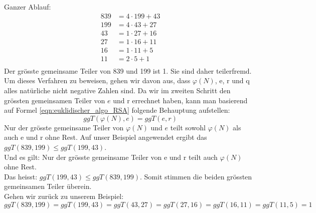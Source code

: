 %
Ganzer Ablauf:
\begin{equation*}
  \begin{split}
    839 &= 4 \cdot 199 + 43\\
    199 &= 4 \cdot 43 + 27\\
    43 &= 1 \cdot 27 + 16\\
    27 &= 1 \cdot 16 + 11\\
    16 &= 1 \cdot 11 + 5\\
    11 &= 2 \cdot 5 + 1\\
    \label{eqn:euqulid_beweis}
  \end{split}
\end{equation*}
%
Der grösste gemeinsame Teiler von 839 und 199 ist 1. Sie sind daher teilerfremd. \\[2ex]
Um dieses Verfahren zu beweisen, gehen wir davon aus, dass $\varphi(N)$, e, r und q alles natürliche nicht negative Zahlen sind. Da wir im zweiten Schritt den grössten gemeinsamen Teiler von $e$ und r errechnet haben, kann man basierend auf Formel \ref{eqn:euklidischer_algo_RSA} folgende Behauptung aufstellen:
%
\begin{equation}
  ggT(\varphi(N),e) = ggT(e,r)
  \label{eqn:ggT}
\end{equation}
%
Nur der grösste gemeinsame Teiler von $\varphi(N)$ und $e$ teilt sowohl $\varphi(N)$ als auch e und r ohne Rest. Auf unser Beispiel angewendet ergibt das $ggT(839,199) \leq ggT(199,43)$.\\
Und es gilt: Nur der grösste gemeinsame Teiler von e und r teilt auch $\varphi(N)$ ohne Rest.\\
Das heisst: $ggT(199,43) \leq ggT(839,199)$.
Somit stimmen die beiden grössten gemeinsamen Teiler überein\cite{zahlentheorie_fuer_einsteiger}.\\[2ex]
Gehen wir zurück zu unserem Beispiel:
%
\begin{equation*}
 ggT(839,199) = ggT(199,43) = ggT(43,27) = ggT(27,16) = ggT(16,11) = ggT(11,5) = 1
\end{equation*}
%
